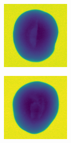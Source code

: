 \documentclass[11pt]{article}
\begin{document}
\begin{figure}[!h]
\begin{subfigure}[b]{0.22\textwidth}
         \caption{}
         \label{fig:hollow_3}
     \end{subfigure}
     \\
    \begin{subfigure}[b]{0.22\textwidth}
         \centering
         \includegraphics[width=\textwidth]{figurer/potato_dataset/hollow/hollow_4.jpg}
         \caption{}
         \label{fig:hollow_4}
     \end{subfigure}
     \hfill
     \begin{subfigure}[b]{0.22\textwidth}
         \centering
         \includegraphics[width=\textwidth]{figurer/potato_dataset/hollow/hollow_5.jpg}

\end{subfigure}
\end{figure}
\end{document}
